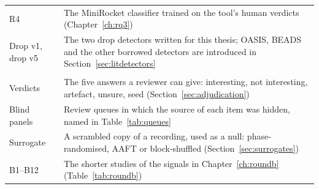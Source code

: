 \begin{small}
\begin{tabularx}{\textwidth}{@{}p{3.6cm} X@{}}
R4 & The MiniRocket classifier trained on the tool's human verdicts (Chapter~\ref{ch:rq3})\\
Drop v1, drop v5 & The two drop detectors written for this thesis; OASIS, BEADS and the other borrowed detectors are introduced in Section~\ref{sec:litdetectors}\\
\addlinespace
\multicolumn{2}{@{}l}{\emph{Reviews and tests}}\\
Verdicts & The five answers a reviewer can give: interesting, not interesting, artefact, unsure, seed (Section~\ref{sec:adjudication})\\
Blind panels & Review queues in which the source of each item was hidden, named in Table~\ref{tab:queues}\\
Surrogate & A scrambled copy of a recording, used as a null: phase-randomised, AAFT or block-shuffled (Section~\ref{sec:surrogates})\\
B1--B12 & The shorter studies of the signals in Chapter~\ref{ch:roundb} (Table~\ref{tab:roundb})\\
\bottomrule
\end{tabularx}
\end{small}
